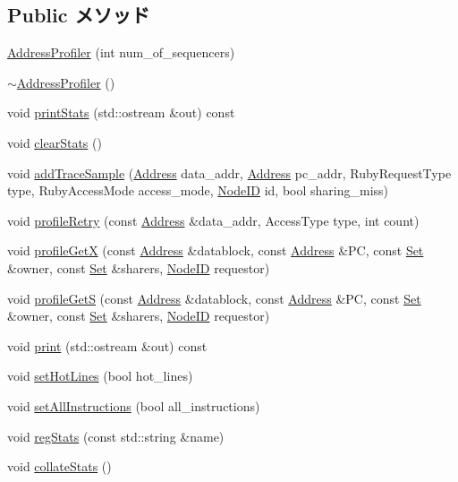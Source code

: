 \subsection*{Public メソッド}
\begin{DoxyCompactItemize}
\item 
\hyperlink{classAddressProfiler_af450d4ff37cb5d876e71ca5ed54b5488}{AddressProfiler} (int num\_\-of\_\-sequencers)
\item 
\hyperlink{classAddressProfiler_adc42b3cd6cc3b0daa903e7cb7f55e16f}{$\sim$AddressProfiler} ()
\item 
void \hyperlink{classAddressProfiler_a38f932a0a623730fe10783f46d243cef}{printStats} (std::ostream \&out) const 
\item 
void \hyperlink{classAddressProfiler_ac7ec7476159db4e2bb0372e30010fc9e}{clearStats} ()
\item 
void \hyperlink{classAddressProfiler_ada40ab5186eed63c4af52be6bfea3cab}{addTraceSample} (\hyperlink{classAddress}{Address} data\_\-addr, \hyperlink{classAddress}{Address} pc\_\-addr, RubyRequestType type, RubyAccessMode access\_\-mode, \hyperlink{TypeDefines_8hh_a83c14b4ae37e80071f6b3506a6c46151}{NodeID} id, bool sharing\_\-miss)
\item 
void \hyperlink{classAddressProfiler_a1c945549407c104dbbeb48debeb9b19a}{profileRetry} (const \hyperlink{classAddress}{Address} \&data\_\-addr, AccessType type, int count)
\item 
void \hyperlink{classAddressProfiler_ab606b5db14b057fe6c99b4632d2fcd79}{profileGetX} (const \hyperlink{classAddress}{Address} \&datablock, const \hyperlink{classAddress}{Address} \&PC, const \hyperlink{classSet}{Set} \&owner, const \hyperlink{classSet}{Set} \&sharers, \hyperlink{TypeDefines_8hh_a83c14b4ae37e80071f6b3506a6c46151}{NodeID} requestor)
\item 
void \hyperlink{classAddressProfiler_a79a57b3f376ac7ef7a55bf73dcff3402}{profileGetS} (const \hyperlink{classAddress}{Address} \&datablock, const \hyperlink{classAddress}{Address} \&PC, const \hyperlink{classSet}{Set} \&owner, const \hyperlink{classSet}{Set} \&sharers, \hyperlink{TypeDefines_8hh_a83c14b4ae37e80071f6b3506a6c46151}{NodeID} requestor)
\item 
void \hyperlink{classAddressProfiler_ac55fe386a101fbae38c716067c9966a0}{print} (std::ostream \&out) const 
\item 
void \hyperlink{classAddressProfiler_a7ec524009c6db09ba82f2ffc4cfff1ea}{setHotLines} (bool hot\_\-lines)
\item 
void \hyperlink{classAddressProfiler_a49ffa3641d3d22f47166dd03dcc39589}{setAllInstructions} (bool all\_\-instructions)
\item 
void \hyperlink{classAddressProfiler_a3dd3443357312bcb75580eaa508c48a4}{regStats} (const std::string \&name)
\item 
void \hyperlink{classAddressProfiler_a208669cbc0bb1d52565956ca8c690c55}{collateStats} ()
\end{DoxyCompactItemize}
